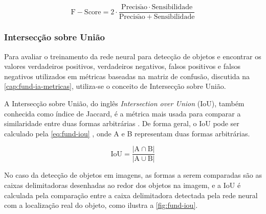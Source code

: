\begin{equation} \label{eq:fund-fscore}
\mathrm{
  F-Score = 2 \cdot \frac{Precis\tilde{a}o \cdot Sensibilidade}{Precis\tilde{a}o + Sensibilidade}
}
\end{equation}

\subsubsection{Intersecção sobre União} \label{cap:fund-ia-metricas-iou}
Para avaliar o treinamento da rede neural para detecção de objetos e encontrar os valores verdadeiros positivos, verdadeiros negativos, falsos positivos e falsos negativos utilizados em métricas baseadas na matriz de confusão, discutida na \autoref{cap:fund-ia-metricas}, utiliza-se o conceito de Intersecção sobre União.

A Intersecção sobre União, do inglês \textit{Intersection over Union} (IoU), também conhecida como índice de Jaccard, é a métrica mais  usada para comparar a similaridade entre duas formas arbitrárias \cite{ref:Rezatofighi-et-al}. De forma geral, o IoU pode ser calculado pela \autoref{eq:fund-iou} \cite{ref:Rezatofighi-et-al}, onde A e B representam duas formas arbitrárias.

\begin{equation} \label{eq:fund-iou}
\mathrm{
  IoU = \frac{|A \cap B|}{|A \cup B|}
}
\end{equation}

No caso da detecção de objetos em imagens, as formas a serem comparadas são as caixas delimitadoras desenhadas ao redor dos objetos na imagem, e a IoU é calculada pela comparação entre a caixa delimitadora detectada pela rede neural com a localização real do objeto, como ilustra a \autoref{fig:fund-iou}.

